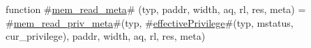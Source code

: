 function #\hyperref[sailRISCVzmemzyreadzymeta]{mem\_read\_meta}# (typ, paddr, width, aq, rl, res, meta) =
  #\hyperref[sailRISCVzmemzyreadzyprivzymeta]{mem\_read\_priv\_meta}#(typ, #\hyperref[sailRISCVzeffectivePrivilege]{effectivePrivilege}#(typ, mstatus, cur_privilege), paddr, width, aq, rl, res, meta)
